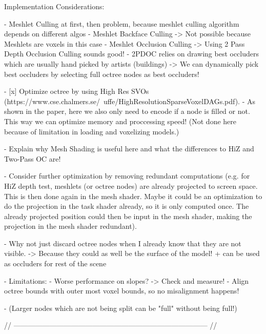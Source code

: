 Implementation Considerations:

- Meshlet Culling at first, then problem, because meshlet culling algorithm depends on different algos
    - Meshlet Backface Culling -> Not possible because Meshlets are voxels in this case
    - Meshlet Occlusion Culling -> Using 2 Pass Depth Occlusion Culling sounds good!
    - 2PDOC relies on drawing best occluders which are usually hand picked by artists (buildings)
        -> We can dynamically pick best occluders by selecting full octree nodes as best occluders!

- [x] Optimize octree by using High Res SVOs (https://www.cse.chalmers.se/~uffe/HighResolutionSparseVoxelDAGs.pdf).
    - As shown in the paper, here we also only need to encode if a node is filled or not. This way we can 
    optimize memory and proccessing speed! (Not done here because of limitation in loading and voxelizing models.)

- Explain why Mesh Shading is useful here and what the differences to HiZ and Two-Pass OC are!

- Consider further optimization by removing redundant computations (e.g. for HiZ depth test, meshlets (or octree nodes)
are already projected to screen space. This is then done again in the mesh shader. Maybe it could be an optimization 
to do the projection in the task shader already, so it is only computed once. The already projected position 
could then be input in the mesh shader, making the projection in the mesh shader redundant).

- Why not just discard octree nodes when I already know that they are not visible. -> Because they could as well be the
  surface of the model! + can be used as occluders for rest of the scene

- Limitations: 
    - Worse performance on slopes? -> Check and measure!
    - Align octree bounds with outer most voxel bounds, so no misalignment happens!

    - (Larger nodes which are not being split can be "full" without being full!)

// --------------------------------------------------------------------------------- //

